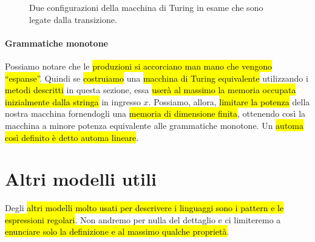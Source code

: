\documentclass[a4paper,11pt,oneside]{article}
\theoremstyle{plain}
\theoremstyle{definition}
\theoremstyle{remark}
\begin{document}
\begin{figure}[htb]
  \centering
  \caption{Due configurazioni della macchina di Turing in esame che sono legate
  dalla transizione.}\label{fig:grammatica-mt-stati}
\end{figure}

\paragraph{Grammatiche monotone} Possiamo notare che le \hl{produzioni si
accorciano man mano che vengono ``espanse''}. Quindi se \hl{costruiamo} una
\hl{macchina di Turing equivalente} utilizzando i \hl{metodi descritti} in
questa sezione, essa \hl{userà al massimo la memoria occupata inizialmente dalla
stringa} in ingresso $x$. Possiamo, allora, \hl{limitare la potenza} della
nostra macchina fornendogli una \hl{memoria di dimensione finita}, ottenendo
così la macchina a minore potenza equivalente alle grammatiche monotone. Un
\hl{automa così definito è detto automa lineare}.

\section{Altri modelli utili}\label{sec:altri-modelli}

Degli \hl{altri modelli molto usati per descrivere i linguaggi sono i pattern e
le espressioni regolari}. Non andremo per nulla del dettaglio e ci limiteremo a
\hl{enunciare solo la definizione e al massimo qualche proprietà}.
\end{document}

